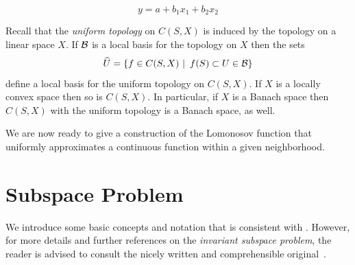 \begin{equation}
y = a + b_1x_1 + b_2x_2
\end{equation}

\medskip

Recall that the {\em uniform topology} on $C(S,X)$ is induced
by the topology on a linear space $X$. If $\cal{B}$ is a local
basis for the topology on $X$ then the sets
\[ \widehat{U}=\left\{f\in C(S,X) \,\,|\,\,\, f(S)\subset U\in\cal{B}\right\} \]
define a local basis for the uniform topology on $C(S,X)$. If
$X$ is a locally convex space then so is $C(S,X)$. In
particular, if $X$ is a Banach space then $C(S,X)$ with the
uniform topology is a Banach space, as well.

\medskip

We are now ready to give a construction of the Lomonosov
function that uniformly approximates a continuous function
within a given neighborhood.


\goodbreak

\def\baselinestretch{1.1}

\section{Subspace Problem}

We introduce some basic concepts and notation that is
consistent with \citep{AAB95}. However, for more details and
further references on the {\em invariant subspace problem}, the
reader is advised to consult the nicely written and
comprehensible original~\citep{AAB95}.

\def\baselinestretch{1.66}
\medskip


